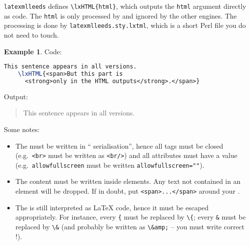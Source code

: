 \documentclass[a4paper]{article}
\theoremstyle{definition}
\newtheorem{exa}{Example}[subsection]
\begin{document}
\verb|latexmlleeds| defines \verb|\lxHTML{html}|, which outputs the \verb|html| argument directly as \HTML{} code. The \verb|html| is only processed by \LaTeXML{} and ignored by the other engines. The \LaTeXML{} processing is done by \verb|latexmlleeds.sty.lxtml|, which is a short Perl file you do not need to touch.
\begin{exa}
  Code:
  \begin{lstlisting}[language=TeX]
    This sentence appears in all versions.
    \lxHTML{<span>But this part is
      <strong>only in the HTML outputs</strong>.</span>}
  \end{lstlisting}
  Output:
  \begin{quote}
    This sentence appears in all versions.
  \end{quote}
\end{exa}

Some notes:
\begin{itemize}
  \item The \HTML{} must be written in ``\XML{} serialisation'', hence all tags must be closed (e.g.\ \verb|<br>| must be written as \verb|<br/>|) and all attributes must have a value (e.g.\ \verb|allowfullscreen| must be written \verb|allowfullscreen=""|).
  \item The content must be written inside \HTML{} elements. Any text not contained in an element will be dropped. If in doubt, put \verb|<span>...</span>| around your \HTML{}.
  \item The \HTML{} is still interpreted as \LaTeX{} code, hence it must be escaped appropriately. For instance, every \verb|{| must be replaced by \verb|\{|; every \verb|&| must be replaced by \verb|\&| (and probably be written as \verb|\&amp;| -- you must write correct \HTML{}!).
\end{itemize}
\end{document}
